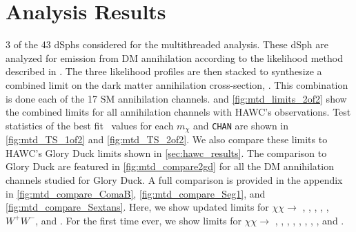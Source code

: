 \section{Analysis Results}\label{sec:mtd_results}

3 of the 43 \LS dSphs considered for the multithreaded analysis.
These dSph are analyzed for emission from DM annihilation according to the likelihood method described in .
The three likelihood profiles are then stacked to synthesize a combined limit on the dark matter annihilation cross-section, \sv.
This combination is done each of the 17 SM annihilation channels.
 and \cref{fig:mtd_limits_2of2} show the combined limits for all annihilation channels with HAWC's observations.
Test statistics of the best fit \sv~values for each $m_\chi$ and \texttt{CHAN} are shown in \cref{fig:mtd_TS_1of2} and \cref{fig:mtd_TS_2of2}.
We also compare these limits to HAWC's Glory Duck limits shown in \cref{sec:hawc_results}.
The comparison to Glory Duck are featured in \cref{fig:mtd_compare2gd} for all the DM annihilation channels studied for Glory Duck.
A full comparison is provided in the appendix in \cref{fig:mtd_compare_ComaB}, \cref{fig:mtd_compare_Seg1}, and \cref{fig:mtd_compare_Sextans}.
Here, we show updated limits for $\chi\chi \rightarrow$ , , \parpar{\mu}, \parpar{\tau}, , $W^+W^-$, \pp{\gamma} and .
For the first time ever, we show limits for $\chi\chi \rightarrow$ , , , , , \parpar{\nu_\mu}, \parpar{\nu_\tau}, , and .

